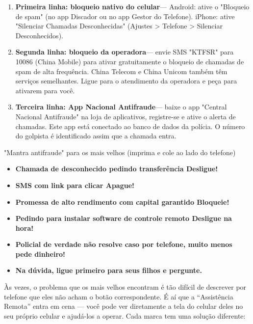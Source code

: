 
\begin{enumerate}
  \item \textbf{Primeira linha: bloqueio nativo do celular}— Android: ative o "Bloqueio de spam" (no app Discador ou no app Gestor do Telefone). iPhone: ative "Silenciar Chamadas Desconhecidas" (Ajustes > Telefone > Silenciar Desconhecidos).
  \item \textbf{Segunda linha: bloqueio da operadora}— envie SMS "KTFSR" para 10086 (China Mobile) para ativar gratuitamente o bloqueio de chamadas de spam de alta frequência. China Telecom e China Unicom também têm serviços semelhantes. Ligue para o atendimento da operadora e peça para ativarem para você.
  \item \textbf{Terceira linha: App Nacional Antifraude}— baixe o app "Central Nacional Antifraude" na loja de aplicativos, registre-se e ative o alerta de chamadas. Este app está conectado ao banco de dados da polícia. O número do golpista é identificado assim que a chamada entra.
\end{enumerate}

\begin{tcbwarn}{"Mantra antifraude" para os mais velhos (imprima e cole ao lado do telefone)}
\begin{itemize}
  \item \textbf{Chamada de desconhecido pedindo transferência Desligue!}
  \item \textbf{SMS com link para clicar Apague!}
  \item \textbf{Promessa de alto rendimento com capital garantido Bloqueie!}
  \item \textbf{Pedindo para instalar software de controle remoto Desligue na hora!}
  \item \textbf{Policial de verdade não resolve caso por telefone, muito menos pede dinheiro!}
  \item \textbf{Na dúvida, ligue primeiro para seus filhos e pergunte.}
\end{itemize}

\end{tcbwarn}


Às vezes, o problema que os mais velhos encontram é tão difícil de descrever por telefone que eles não acham o botão correspondente. É aí que a “Assistência Remota” entra em cena — você pode ver diretamente a tela do celular deles no seu próprio celular e ajudá-los a operar. Cada marca tem uma solução diferente:

